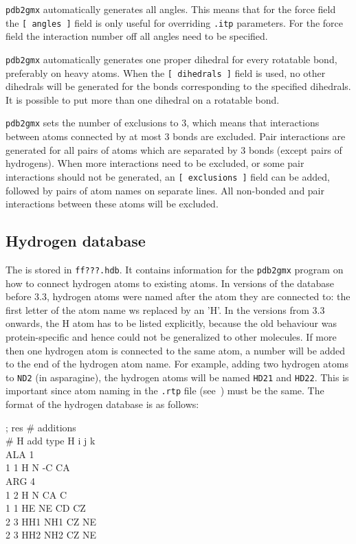 {\tt pdb2gmx} automatically generates all angles. This means that for the
{\gromacs} force field
the {\tt [~angles~]} field is only useful for overriding {\tt .itp}
parameters. For the {} force field the interaction number
off all angles need to be specified.

{\tt pdb2gmx} automatically generates one proper dihedral for every rotatable
bond, preferably on heavy atoms. When the {\tt [~dihedrals~]} field is used,
no other dihedrals will be generated for the bonds corresponding to the
specified  dihedrals. It is possible to put more than one dihedral on a
rotatable bond. 

{\tt pdb2gmx} sets the number of exclusions to 3, which
means that interactions between atoms connected by at most 3 bonds are
excluded. Pair interactions are generated for all pairs of atoms which are
separated by 3 bonds (except pairs of hydrogens).
When more interactions need to be excluded, or some pair interactions should
not be generated, an {\tt [~exclusions~]} field can be added, followed by
pairs of atom names on separate lines. All non-bonded and pair interactions
between these atoms will be excluded.

\subsection{Hydrogen database}
\label{subsec:hdb}
The  is stored in {\tt ff???.hdb}. It
contains information for the {\tt pdb2gmx} program on how to connect
hydrogen atoms to existing atoms. In versions of the database before
{\gromacs} 3.3, hydrogen atoms were named after the atom they are
connected to: the first letter of the atom name ws replaced by an
'H'. In the versions from 3.3 onwards, the H atom has to be listed explicitly,
because the old behaviour was protein-specific and hence could not
be generalized to other molecules.
If more then one hydrogen atom is connected to the same atom, a
number will be added to the end of the hydrogen atom name. For
example, adding two hydrogen atoms to {\tt ND2} (in asparagine), the
hydrogen atoms will be named {\tt HD21} and {\tt HD22}. This is
important since atom naming in the {\tt .rtp} file (see~)
must be the same. The format of the hydrogen database is as follows:\\
%
\begin{small}
\begin{tt}
; res   \# additions\\
        \# H add type    H       i       j       k\\
ALA     1\\
        1       1       H       N       -C      CA\\
ARG     4\\
        1       2       H       N       CA      C\\
        1       1       HE      NE      CD      CZ\\
        2       3       HH1     NH1     CZ      NE\\
        2       3       HH2     NH2     CZ      NE\\
\end{tt}
\end{small}

